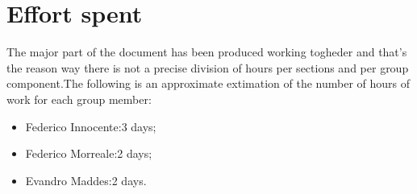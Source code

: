 \documentclass[../ATD.tex]{subfiles}
\begin{document}
    \chapter{Effort spent}\label{ch:effort-spent}
    The major part of the document has been produced working togheder and that’s the reason way there is not a precise division of hours per sections and per group component.The following is an approximate extimation of the number of hours of work for each group member:
    \begin{itemize}
        \item Federico Innocente:3 days;
        \item Federico Morreale:2 days;
        \item Evandro Maddes:2 days.
    \end{itemize}
\end{document}
